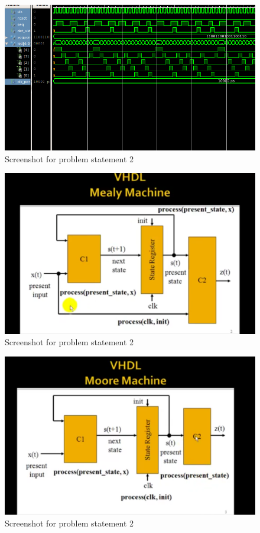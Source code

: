 \documentclass[11pt]{report}
\begin{document}
	\pagebreak
	\begin{figure}[h!]
	\centering
	\includegraphics[scale=0.6, center]{images/screenshot24}
	\caption{Screenshot for problem statement 2}
	\end{figure}
	\pagebreak
	\begin{figure}[h!]
	\centering
	\includegraphics[scale=0.6, center]{images/screenshot25}
	\caption{Screenshot for problem statement 2}
	\end{figure}
	\pagebreak
	\begin{figure}[h!]
	\centering
	\includegraphics[scale=0.6, center]{images/screenshot26}
	\caption{Screenshot for problem statement 2}
	\end{figure}
\end{document}

